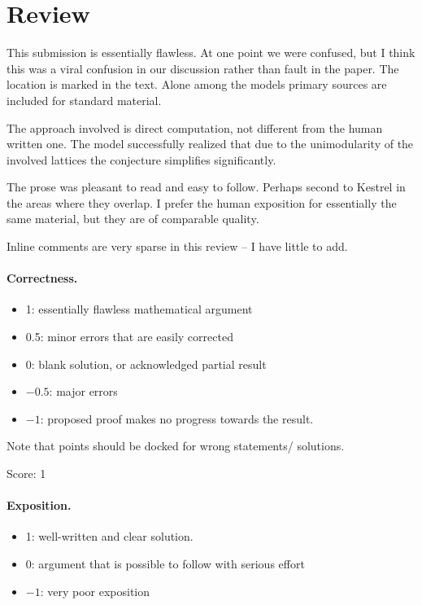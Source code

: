\documentclass[11pt]{article}
\theoremstyle{definition}
\theoremstyle{remark}
\begin{document}
\maketitle

\section{Review}

This submission is essentially flawless. At one point we were confused, but I
think this was a viral confusion in our discussion rather than fault in the paper. The location
is marked in the text. Alone among the models primary sources are included for standard material.

The approach involved is direct computation, not different from the human written one. The model successfully
realized that due to the unimodularity of the involved lattices the conjecture simplifies significantly.

The prose was pleasant to read and easy to follow. Perhaps second to Kestrel in the areas where they overlap.
I prefer the human exposition for essentially the same material, but they are of comparable quality.

Inline comments are very sparse in this review -- I have little to add.

\paragraph{Correctness.}
\begin{itemize}
	\item  1: essentially flawless mathematical argument
	\item  0.5: minor errors that are easily corrected
	\item  0: blank solution, or acknowledged partial result
	\item  $-0.5$: major errors
	\item  $-1$: proposed proof makes no progress towards the result.
\end{itemize}
Note that points should be docked for wrong statements/ solutions.

\noindent Score: 1

\paragraph{Exposition.}
\begin{itemize}
	\item  1: well-written and clear solution.
	\item  0: argument that is possible to follow with serious effort
	\item  $-1$: very poor exposition
\end{itemize}
\end{document}
